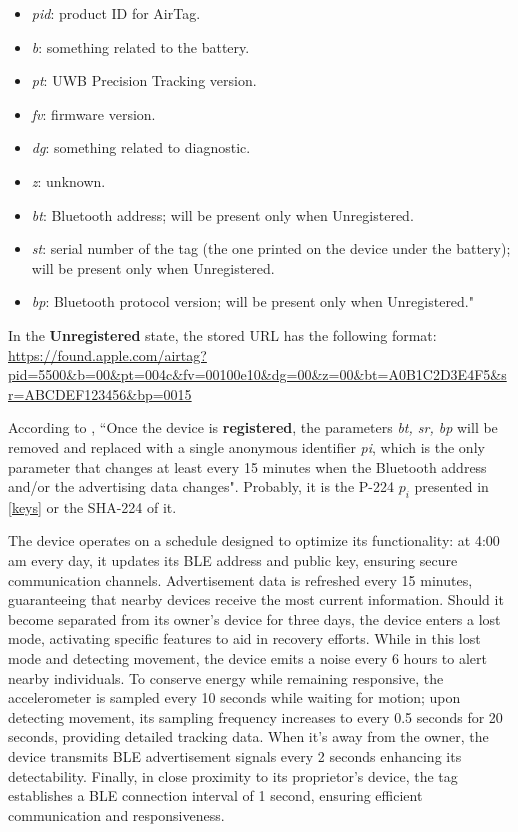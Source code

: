 \documentclass[english]{article}
\begin{document}
\begin{itemize}
  \item \textit{pid}: product ID for AirTag.
  \item \textit{b}: something related to the battery.
  \item \textit{pt}: UWB Precision Tracking version.
  \item \textit{fv}: firmware version.
  \item \textit{dg}: something related to diagnostic.
  \item \textit{z}: unknown.
  \item \textit{bt}: Bluetooth address; will be present only when Unregistered.
  \item \textit{st}: serial number of the tag (the one printed on the device under the battery); will be present only when Unregistered.
  \item \textit{bp}: Bluetooth protocol version; will be present only when Unregistered."
\end{itemize}
In the \textbf{Unregistered} state, the stored URL has the following format:
\url{https://found.apple.com/airtag?pid=5500&b=00&pt=004c&fv=00100e10&dg=00&z=00&bt=A0B1C2D3E4F5&sr=ABCDEF123456&bp=0015}

According to \cite{reverse},
``Once the device is \textbf{registered}, the parameters \textit{bt, sr, bp} will be removed and replaced with a single anonymous identifier \textit{pi}, which is the only parameter that changes at least every 15 minutes when the Bluetooth address and/or the advertising data changes". Probably, it is the P-224  $p_i$ presented in \ref{keys} or the SHA-224 of it. 


The device operates on a schedule designed to optimize its functionality:
at 4:00 am every day, it updates its BLE address and public key, ensuring secure communication channels.
Advertisement data is refreshed every 15 minutes, guaranteeing that nearby devices receive the most current information.
Should it become separated from its owner's device for three days, the device enters a lost mode, activating specific features to aid in recovery efforts.
While in this lost mode and detecting movement, the device emits a noise every 6 hours to alert nearby individuals.
To conserve energy while remaining responsive, the accelerometer is sampled every 10 seconds while waiting for motion; upon detecting movement, its sampling frequency increases to every 0.5 seconds for 20 seconds, providing detailed tracking data.
When it's away from the owner, the device transmits BLE advertisement signals every 2 seconds enhancing its detectability.
Finally, in close proximity to its proprietor's device, the tag establishes a BLE connection interval of 1 second, ensuring efficient communication and responsiveness.
\end{document}
